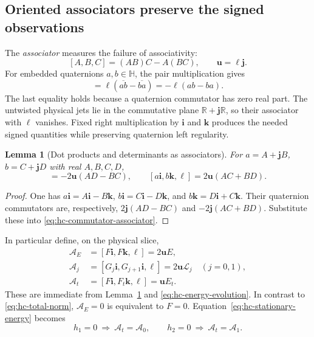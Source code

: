 \documentclass[11pt]{article}
\numberwithin{equation}{section}
\newtheorem{lemma}[theorem]{Lemma}
\theoremstyle{definition}
\theoremstyle{remark}
\newcommand{\R}{\mathbb R}
\newcommand{\HH}{\mathbb H}
\newcommand{\ii}{\mathbf i}
\newcommand{\jj}{\mathbf j}
\newcommand{\kk}{\mathbf k}
\begin{document}
\subsection{Oriented associators preserve the signed observations}

The \emph{associator} measures the failure of associativity:
\[
 [A,B,C]=(AB)C-A(BC),\qquad \mathbf u=\ell\jj.
\]
For embedded quaternions \(a,b\in\HH\), the pair multiplication gives
\begin{equation}
 [a,b,\ell]=\ell(\overline{ab}-\overline{ba})
             =-\ell(ab-ba).
 \label{eq:hc-commutator-associator}
\end{equation}
The last equality holds because a quaternion commutator has zero real
part. The untwisted physical jets lie in the commutative plane
\(\R+\jj\R\), so their associator with \(\ell\) vanishes.
Fixed right multiplication by \(\ii\) and \(\kk\) produces the needed
signed quantities while preserving quaternion left regularity.

\begin{lemma}[Dot products and determinants as associators]
\label{lem:hc-twisted-associators}
For \(a=A+\jj B\), \(b=C+\jj D\) with real \(A,B,C,D\),
\begin{equation}
 [a\ii,b\ii,\ell]=-2\mathbf u(AD-BC),
 \qquad
 [a\ii,b\kk,\ell]=2\mathbf u(AC+BD).
 \label{eq:hc-twisted-associators}
\end{equation}
\end{lemma}
\begin{proof}
One has \(a\ii=A\ii-B\kk\), \(b\ii=C\ii-D\kk\), and
\(b\kk=D\ii+C\kk\). Their quaternion commutators are, respectively,
\(2\jj(AD-BC)\) and \(-2\jj(AC+BD)\). Substitute these into
\eqref{eq:hc-commutator-associator}.
\end{proof}

In particular define, on the physical slice,
\begin{align}
 \mathcal A_E&=[F\ii,F\kk,\ell]=2\mathbf u E,
       \label{eq:hc-associator-energy}\\
 \mathcal A_j&=[G_j\ii,G_{j+1}\ii,\ell]
                    =2\mathbf u\mathcal L_j\quad(j=0,1),
       \label{eq:hc-associator-signs}\\
 \mathcal A_t&=[F\ii,F_t\kk,\ell]=\mathbf u E_t.
       \label{eq:hc-associator-time}
\end{align}
These are immediate from Lemma~\ref{lem:hc-twisted-associators} and
\eqref{eq:hc-energy-evolution}. In contrast to
\eqref{eq:hc-total-norm}, \(\mathcal A_E=0\) is equivalent to \(F=0\).
Equation~\eqref{eq:hc-stationary-energy} becomes
\[
 h_1=0\ \Longrightarrow\ \mathcal A_t=\mathcal A_0,
 \qquad
 h_2=0\ \Longrightarrow\ \mathcal A_t=\mathcal A_1.
\]
\end{document}
